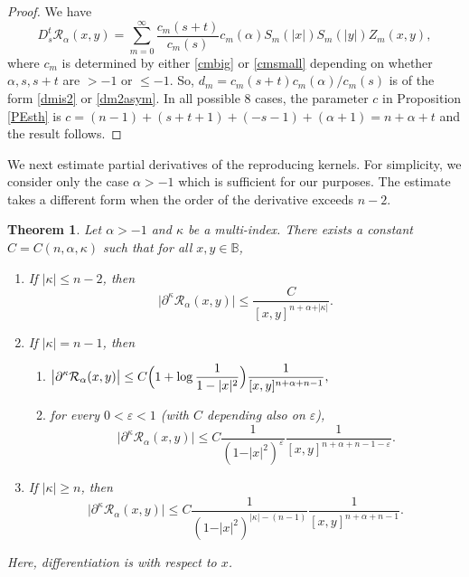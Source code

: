 \documentclass{amsart}
\newtheorem{theorem}{Theorem}[section]
\theoremstyle{definition}
\theoremstyle{remark}
\begin{document}
\begin{proof}
We have
\begin{equation*}
D^t_s\mathcal R_\alpha(x,y)=\sum_{m=0}^\infty
\frac{c_m(s+t)}{c_m(s)}c_m(\alpha)
S_m(\vert x\vert)S_m(\vert y\vert)Z_m(x,y),
\end{equation*}
where $c_m$ is determined by either \eqref{cmbig} or \eqref{cmsmall}
depending on whether $\alpha,s,s+t$ are $>-1$ or $\le -1$.
So, $d_m=c_m(s+t)c_m(\alpha)/c_m(s)$ is of the form \eqref{dmis2} or \eqref{dm2asym}.
In all possible $8$ cases, the parameter $c$ in Proposition
\ref{PEsth} is $c=(n-1)+(s+t+1)+(-s-1)+(\alpha+1)=n+\alpha+t$
and the result follows.
\end{proof}

We next estimate partial derivatives of the reproducing kernels.
For simplicity, we consider only the case $\alpha>-1$ which is
sufficient for our purposes.
The estimate takes a different form when the order of the derivative
exceeds $n-2$.

\begin{theorem}\label{TPartialKernel}
Let $\alpha>-1$ and $\kappa$ be a multi-index.
There exists a constant $C=C(n,\alpha,\kappa)$ such that for all
$x,y\in\mathbb B$,
\begin{enumerate}
\item[(i)] If $\vert\kappa\vert\le n-2$, then
\begin{equation*}
\vert\partial^\kappa\mathcal R_\alpha(x,y)\vert
\le \frac{C}{[x,y]^{n+\alpha+\vert\kappa\vert}}.
\end{equation*}
\item[(ii)] If $\vert\kappa\vert=n-1$, then
\begin{enumerate}
\item[(a)]
$\displaystyle
\bigl\vert\partial^\kappa\mathcal R_\alpha(x,y)\bigr\vert
\le C\Bigl(1+\log\frac{1}{1-\vert x\vert^2}\Bigr)
\frac{1}{[x,y]^{n+\alpha+n-1}},$
\item[(b)]
for every $0<\varepsilon<1$ (with $C$ depending also on $\varepsilon$),
\begin{equation*}
\bigl\vert\partial^\kappa\mathcal R_\alpha(x,y)\bigr\vert
\le C\frac{1}{(1-\vert x\vert^2)^{\varepsilon}}
\frac{1}{[x,y]^{n+\alpha+n-1-\varepsilon}}.
\end{equation*}
\end{enumerate}
\item[(iii)] If $\vert\kappa\vert\ge n$, then
\begin{equation*}
\bigl\vert\partial^\kappa\mathcal R_\alpha(x,y)\bigr\vert
\le C\frac{1}{(1-\vert x\vert^2)^{\vert\kappa\vert-(n-1)}}
\frac{1}{[x,y]^{n+\alpha+n-1}}.
\end{equation*}
\end{enumerate}
Here, differentiation is with respect to $x$.
\end{theorem}
\end{document}
